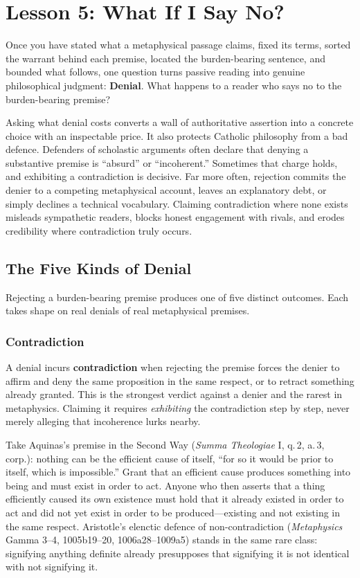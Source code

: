 \section{Lesson 5: What If I Say No?}

Once you have stated what a metaphysical passage claims, fixed its terms, sorted the warrant behind each premise, located the burden-bearing sentence, and bounded what follows, one question turns passive reading into genuine philosophical judgment: \textbf{Denial}. What happens to a reader who says no to the burden-bearing premise?

Asking what denial costs converts a wall of authoritative assertion into a concrete choice with an inspectable price. It also protects Catholic philosophy from a bad defence. Defenders of scholastic arguments often declare that denying a substantive premise is ``absurd'' or ``incoherent.'' Sometimes that charge holds, and exhibiting a contradiction is decisive. Far more often, rejection commits the denier to a competing metaphysical account, leaves an explanatory debt, or simply declines a technical vocabulary. Claiming contradiction where none exists misleads sympathetic readers, blocks honest engagement with rivals, and erodes credibility where contradiction truly occurs.

\subsection{The Five Kinds of Denial}

Rejecting a burden-bearing premise produces one of five distinct outcomes. Each takes shape on real denials of real metaphysical premises.

\subsubsection*{Contradiction}

A denial incurs \textbf{contradiction} when rejecting the premise forces the denier to affirm and deny the same proposition in the same respect, or to retract something already granted. This is the strongest verdict against a denier and the rarest in metaphysics. Claiming it requires \emph{exhibiting} the contradiction step by step, never merely alleging that incoherence lurks nearby.

Take Aquinas's premise in the Second Way (\emph{Summa Theologiae} I, q.\,2, a.\,3, corp.): nothing can be the efficient cause of itself, ``for so it would be prior to itself, which is impossible.'' Grant that an efficient cause produces something into being and must exist in order to act. Anyone who then asserts that a thing efficiently caused its own existence must hold that it already existed in order to act and did not yet exist in order to be produced---existing and not existing in the same respect. Aristotle's elenctic defence of non-contradiction (\emph{Metaphysics} Gamma 3--4, 1005b19--20, 1006a28--1009a5) stands in the same rare class: signifying anything definite already presupposes that signifying it is not identical with not signifying it.


